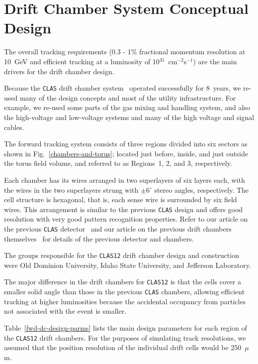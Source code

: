 \section{Drift Chamber System Conceptual Design}

The overall tracking requirements (0.3 -  1\% fractional momentum resolution 
at 10~GeV and efficient tracking at a luminosity of 
10$^{35}$~cm$^{-2}$s$^{-1}$) are the main drivers for the drift chamber design.  

Because the {\tt CLAS} drift chamber system~\cite{dcnim} operated 
successfully for 8~years, we re-used many of the design concepts and 
most of the utility infrastructure.  For example, we re-used some
parts of the gas mixing and handling system, and also the high-voltage 
and low-voltage systems and many of the high voltage and signal cables. 

The forward tracking system consists of three regions divided into six
sectors as shown in Fig.~\ref{chambers-and-torus}; located just before, inside, 
and just outside the torus field volume, and referred to as Regions~1, 2, 
and 3, respectively.  

Each chamber has its wires arranged in two superlayers of
six layers each, with the wires in the two superlayers strung with 
$\pm$6$^\circ$ stereo angles, respectively.  The cell structure is 
hexagonal, that is, each sense wire is surrounded by six field wires.  This 
arrangement is similar to the previous {\tt CLAS} design and offers good 
resolution with very good pattern recognition properties.  Refer to our 
article on the previous {\tt CLAS} detector~\cite{clasnim} and our article 
on the previous drift chambers themselves~\cite{dcnim} for details of the 
previous detector and chambers.  

The groups responsible for the {\tt CLAS12} drift
chamber design and construction were Old Dominion University, Idaho State
University, and Jefferson Laboratory.

The major difference in the drift chambers for {\tt CLAS12} is that the 
cells cover a smaller solid angle than those in the previous {\tt CLAS} 
chambers, allowing efficient tracking at higher luminosities because the 
accidental occupancy from particles not associated with the event is smaller.  

Table~\ref{fwd-dc-design-parms} lists the main design parameters for each 
region of the {\tt CLAS12} drift chambers.  For the purposes of simulating 
track resolutions, we assumed that the position resolution of the individual 
drift cells would be 250~$\mu$m.  

